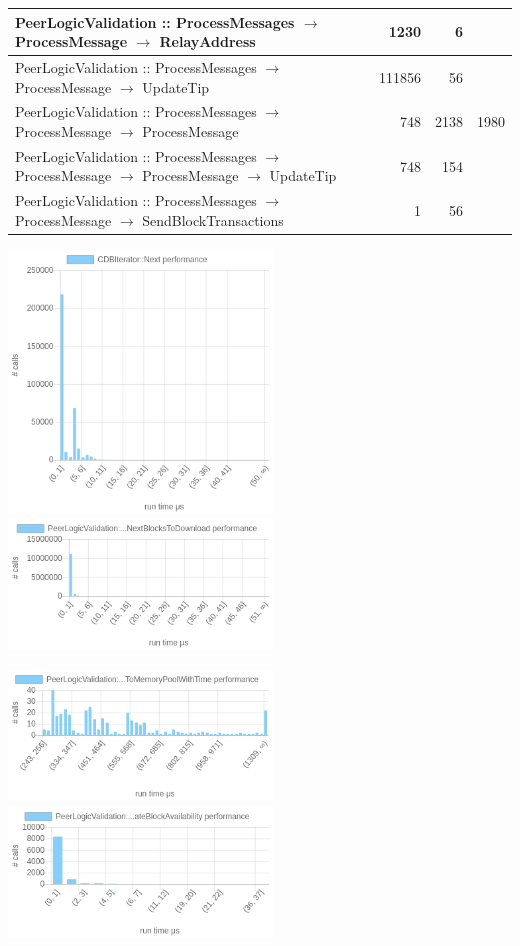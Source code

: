 \documentclass{article}
\begin{document}
\begin{longtable}{P{8cm}|r|r|r}
	PeerLogicValidation :: ProcessMessages $\to$ ProcessMessage $\to$ RelayAddress& 1230& 6&\\\hline
	PeerLogicValidation :: ProcessMessages $\to$ ProcessMessage $\to$ UpdateTip& 111856& 56&\\\hline
	PeerLogicValidation :: ProcessMessages $\to$ ProcessMessage $\to$ ProcessMessage& 748& 2138&1980\\\hline
	PeerLogicValidation :: ProcessMessages $\to$ ProcessMessage $\to$ ProcessMessage $\to$ UpdateTip& 748& 154&\\\hline
	PeerLogicValidation :: ProcessMessages $\to$ ProcessMessage $\to$ SendBlockTransactions& 1& 56&\\\hline
\end{longtable}


\includegraphics[width=7cm]{images/mumbai/chartCDBIterator_3A_3ANext.png}
\includegraphics[width=7cm]{images/mumbai/chartPeerLogicValidation_3A_3ASendMessages-_3EFindNextBlocksToDownload.png}

\includegraphics[width=7cm]{images/mumbai/chartPeerLogicValidation_3A_3AProcessMessages-_3EProcessMessage-_3EAcceptToMemoryPoolWithTime.png}
\includegraphics[width=7cm]{images/mumbai/chartPeerLogicValidation_3A_3AProcessMessages-_3EProcessMessage-_3EProcessHeadersMessage-_3EUpdateBlockAvailability.png}
\end{document}
